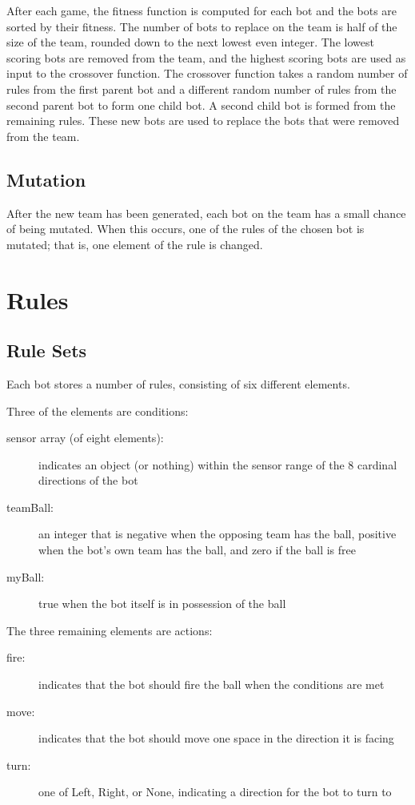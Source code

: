 \documentclass[%
        compressed,
        notitlepage,
        narroweqnarray,
        inline,
        ]{ieee}
\begin{document}
After each game, the fitness function is computed for each bot and the bots
are sorted by their fitness. The number of bots to replace on the team is
half of the size of the team, rounded down to the next lowest even integer.
The lowest scoring bots are removed from the team, and the highest scoring
bots are used as input to the crossover function. The crossover function
takes a random number of rules from the first parent bot and a
different random number of rules from the second parent bot to form one child
bot. A second child bot is formed from the remaining rules. These new bots
are used to replace the bots that were removed from the team.

\subsection{Mutation}

After the new team has been generated, each bot on the team has a small
chance of being mutated. When this occurs, one of the rules of the chosen bot is
mutated; that is, one element of the rule is changed.

\section{Rules}

\subsection{Rule Sets}

Each bot stores a number of rules, consisting of six different elements.

Three of the elements are conditions:
\nopagebreak
\begin{description}
\item[sensor array (of eight elements):] indicates an object (or nothing)
within the sensor range of the 8 cardinal directions of the bot 
\item[teamBall:] an integer that is negative when the opposing team has the
ball, positive when the bot's own team has the ball, and zero if the ball is
free
\item[myBall:] true when the bot itself is in possession of the ball
\end{description}

The three remaining elements are actions:
\nopagebreak
\begin{description}
\item[fire:] indicates that the bot should fire the ball when the conditions are met 
\item[move:] indicates that the bot should move one space in the direction it is facing 
\item[turn:] one of Left, Right, or None, indicating a direction for the bot to turn to
\end{description}
\end{document}

